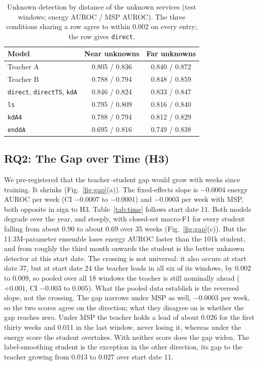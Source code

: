 \documentclass[journal]{IEEEtran}
\newcommand{\kd}[1]{\texttt{#1}}
\begin{document}
\begin{table}[t]
\centering
\caption{Unknown detection by distance of the unknown services (test windows; energy AUROC / MSP AUROC). The three conditions sharing a row agree to within 0.002 on every entry; the row gives \kd{direct}.}
\label{tab:nearfar}
\begin{tabular}{lcc}
\toprule
Model & Near unknowns & Far unknowns \\
\midrule
Teacher A & 0.805 / 0.836 & 0.840 / 0.872 \\
Teacher B & 0.788 / 0.794 & 0.848 / 0.859 \\
\kd{direct}, \kd{directTS}, \kd{kdA} & 0.846 / 0.824 & 0.833 / 0.847 \\
\kd{ls}   & 0.795 / 0.809 & 0.816 / 0.840 \\
\kd{kdA4} & 0.788 / 0.794 & 0.812 / 0.829 \\
\kd{enddA} & 0.695 / 0.816 & 0.749 / 0.838 \\
\bottomrule
\end{tabular}
\end{table}

\subsection{RQ2: The Gap over Time (H3)}

We pre-registered that the teacher--student gap would grow with weeks since training. It shrinks (Fig.~\ref{fig:gap}(a)). The fixed-effects slope is $-0.0004$ energy AUROC per week (CI $-0.0007$ to $-0.0001$) and $-0.0003$ per week with MSP, both opposite in sign to H3. Table~\ref{tab:time} follows start date 11. Both models degrade over the year, and steeply, with closed-set macro-F1 for every student falling from about 0.90 to about 0.69 over 35 weeks (Fig.~\ref{fig:gap}(c)). But the 11.3M-parameter ensemble loses energy AUROC faster than the 101k student, and from roughly the third month onwards the student is the better unknown detector at this start date. The crossing is not universal: it also occurs at start date 37, but at start date 24 the teacher leads in all six of its windows, by $0.002$ to $0.009$, so pooled over all 18 windows the teacher is still nominally ahead ($+0.001$, CI $-0.003$ to $0.005$). What the pooled data establish is the reversed slope, not the crossing. The gap narrows under MSP as well, $-0.0003$ per week, so the two scores agree on the direction; what they disagree on is whether the gap reaches zero. Under MSP the teacher holds a lead of about 0.026 for the first thirty weeks and 0.011 in the last window, never losing it, whereas under the energy score the student overtakes. With neither score does the gap widen. The label-smoothing student is the exception in the other direction, its gap to the teacher growing from 0.013 to 0.027 over start date 11.
\end{document}
